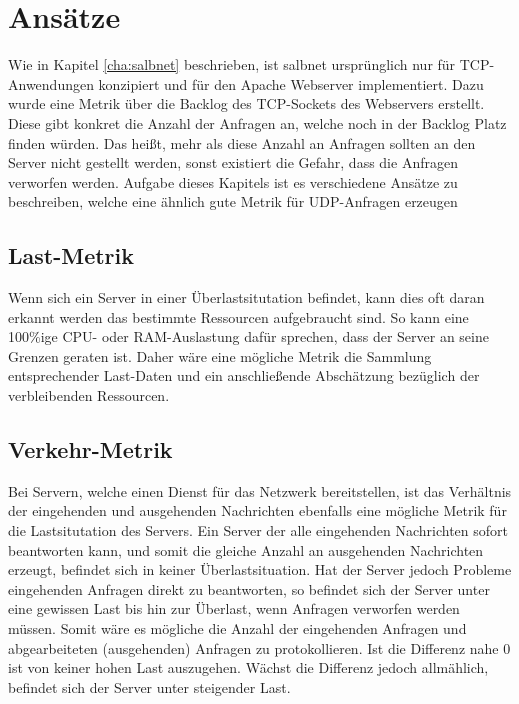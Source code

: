 \documentclass[a4paper, 12pt, BCOR10mm, DIV12, toc=bibliography, toc=listof, german]{scrbook}
\begin{document}
		\section{Ansätze} %
		\label{sec:ansaetze}

		Wie in Kapitel \ref{cha:salbnet} beschrieben, ist salbnet ursprünglich nur für TCP-Anwendungen
		konzipiert und für den Apache Webserver implementiert. Dazu wurde eine Metrik über die Backlog
		des TCP-Sockets des Webservers erstellt. Diese gibt konkret die Anzahl der Anfragen an, welche
		noch in der Backlog Platz finden würden. Das heißt, mehr als diese Anzahl an Anfragen sollten an
		den Server nicht gestellt werden, sonst existiert die Gefahr, dass die Anfragen verworfen
		werden. Aufgabe dieses Kapitels ist es verschiedene Ansätze zu beschreiben, welche eine ähnlich
		gute Metrik für UDP-Anfragen erzeugen

		\subsection*{Last-Metrik} %

		Wenn sich ein Server in einer Überlastsitutation befindet, kann dies oft daran erkannt werden
		das bestimmte Ressourcen aufgebraucht sind. So kann eine 100\%ige CPU- oder RAM-Auslastung dafür
		sprechen, dass der Server an seine Grenzen geraten ist. Daher wäre eine mögliche Metrik die
		Sammlung entsprechender Last-Daten und ein anschließende Abschätzung bezüglich der verbleibenden
		Ressourcen.
		

		\subsection*{Verkehr-Metrik} %

		Bei Servern, welche einen Dienst für das Netzwerk bereitstellen, ist das Verhältnis der
		eingehenden und ausgehenden Nachrichten ebenfalls eine mögliche Metrik für die Lastsitutation
		des Servers. Ein Server der alle eingehenden Nachrichten sofort beantworten kann, und somit die
		gleiche Anzahl an ausgehenden Nachrichten erzeugt, befindet sich in keiner Überlastsituation.
		Hat der Server jedoch Probleme eingehenden Anfragen direkt zu beantworten, so befindet sich der
		Server unter eine gewissen Last bis hin zur Überlast, wenn Anfragen verworfen werden müssen.
		Somit wäre es mögliche die Anzahl der eingehenden Anfragen und abgearbeiteten (ausgehenden)
		Anfragen zu protokollieren. Ist die Differenz nahe 0 ist von keiner hohen Last auszugehen.
		Wächst die Differenz jedoch allmählich, befindet sich der Server unter steigender Last.
\end{document}

